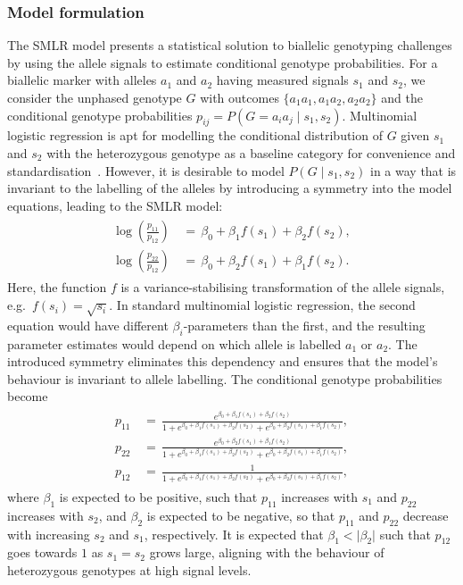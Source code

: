 \documentclass[preprint,5p,times,11pt]{elsarticle}
\begin{document}
\subsubsection{Model formulation}
The SMLR model presents a statistical solution to biallelic genotyping challenges by using the allele signals to estimate conditional genotype probabilities.
For a biallelic marker with alleles $a_1$ and $a_2$ having measured signals $s_1$ and $s_2$, we consider the unphased genotype $G$ with outcomes $\{a_1a_1, a_1a_2, a_2a_2\}$ and the conditional genotype probabilities $p_{ij} = P\left(G = a_i a_j \mid s_1, s_2 \right)$.
Multinomial logistic regression is apt for modelling the conditional distribution of $G$ given $s_1$ and $s_2$ with the heterozygous genotype as a baseline category for convenience and standardisation~\cite[p.~293]{agresti}.
However, it is desirable to model $P(G \mid s_1, s_2)$ in a way that is invariant to the labelling of the alleles by introducing a symmetry into the model equations, leading to the SMLR model:
\begin{align}\label{eq:smlr}
\begin{split}
\log\left(\frac{p_{11}}{p_{12}}\right) \, &= \, \beta_0 + \beta_1 f(s_1) + \beta_2 f(s_2), \\
\log\left(\frac{p_{22}}{p_{12}}\right) \, &= \, \beta_0 + \beta_2 f(s_1) + \beta_1 f(s_2).
\end{split}
\end{align}
Here, the function $f$ is a variance-stabilising transformation of the allele signals, e.g.~$f(s_i) = \sqrt{s_i}$.
In standard multinomial logistic regression, the second equation would have different $\beta_i$-parameters than the first, and the resulting parameter estimates would depend on which allele is labelled $a_1$ or $a_2$.
The introduced symmetry eliminates this dependency and ensures that the model's behaviour is invariant to allele labelling.
The conditional genotype probabilities become
\begin{align}\label{eq:posterior}
\begin{split}
p_{11} \, &= \, \frac{e^{\beta_0 + \beta_1 f(s_1) + \beta_2 f(s_2) }}{1 + e^{\beta_0 + \beta_1 f(s_1) + \beta_2 f(s_2)} + e^{\beta_0 + \beta_2 f(s_1) + \beta_1 f(s_2)}}, \\
p_{22} \, &= \, \frac{e^{\beta_0 + \beta_2 f(s_1) + \beta_1 f(s_2) }}{1 + e^{\beta_0 + \beta_1 f(s_1) + \beta_2 f(s_2)} + e^{\beta_0 + \beta_2 f(s_1) + \beta_1 f(s_2)}}, \\
p_{12} \, &= \, \frac{1}{1 + e^{\beta_0 + \beta_1 f(s_1) + \beta_2 f(s_2)} + e^{\beta_0 + \beta_2 f(s_1) + \beta_1 f(s_2)}},
\end{split}
\end{align}
where $\beta_1$ is expected to be positive, such that $p_{11}$ increases with $s_1$ and $p_{22}$ increases with $s_2$, and $\beta_2$ is expected to be negative, so that $p_{11}$ and $p_{22}$ decrease with increasing $s_2$ and $s_1$, respectively.
It is expected that $\beta_1 < \lvert \beta_2 \rvert$ such that $p_{12}$ goes towards $1$ as $s_1 = s_2$ grows large, aligning with the behaviour of heterozygous genotypes at high signal levels.
\end{document}

